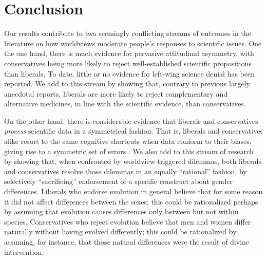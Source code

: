 \documentclass[fignum,man]{apa}\usepackage[]{graphicx}\usepackage[]{color}
\begin{document}
\section{Conclusion}
Our results contribute to two seemingly conflicting streams 
of outcomes
in the literature on 
how worldviews moderate people's responses to scientific issues. 
One the one hand, there is much evidence for pervasive attitudinal
asymmetry, with conservatives being more likely to reject
well-established scientific propositions than liberals. To date,
little or no evidence for left-wing science denial has been reported.
We add to this stream by showing that, contrary to previous largely
anecdotal reports, liberals are more likely to reject complementary
and alternative medicines, in line with the scientific evidence, than
conservatives. 

On the other hand, there is considerable evidence that
liberals and conservatives \textit{process} scientific data
in a symmetrical fashion. That is, liberals and conservatives
alike resort to the same cognitive shortcuts when data conform to their
biases, giving rise to a symmetric set of errors \cite{Kahan17b,Washburn17}.
We also add to this stream of research by showing that, when confronted
by worldview-triggered dilemmas, both liberals and conservatives
resolve those dilemmas in an equally ``rational'' fashion,
by selectively ``sacrificing'' endorsement of a specific
construct about gender differences. 
Liberals who endorse evolution in general believe that for 
some reason it did not affect differences between the sexes; 
this could be rationalized perhaps by assuming that evolution causes 
differences only between but not within species. 
Conservatives who reject evolution believe that men and women differ 
naturally without having evolved differently; this could be 
rationalized by assuming, for instance, that those natural differences 
were the result of divine intervention.
\end{document}
